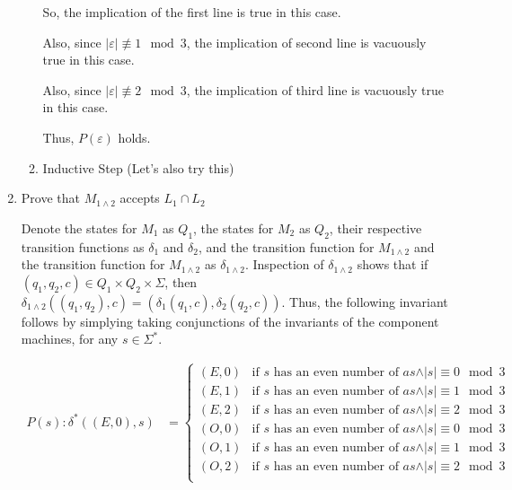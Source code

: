 \documentclass[12pt]{article}
\begin{document}
\begin{enumerate}[1.]
\begin{enumerate}[1.]
\begin{mdframed}
        \bigskip

        So, the implication of the first line is true in this case.

        \bigskip

        Also, since $\vert \varepsilon \vert \not\equiv 1 \mod 3$, the implication
        of second line is vacuously true in this case.

        \bigskip

        Also, since $\vert \varepsilon \vert \not\equiv 2 \mod 3$, the implication
        of third line is vacuously true in this case.

        \bigskip

        Thus, $P(\varepsilon)$ holds.

        \end{mdframed}

        \item Inductive Step (Let's also try this)

        \begin{mdframed}

        \end{mdframed}

    \end{enumerate}

    \item Prove that $M_{1\land2}$ accepts $L_1 \cap L_2$

    \bigskip

    Denote the states for $M_1$ as $Q_1$, the states for $M_2$ as $Q_2$, their
    respective transition functions as $\delta_1$ and $\delta_2$, and the transition
    function for $M_{1\land 2}$ and the transition function for $M_{1\land 2}$ as $\delta_{1 \land 2}$.
    Inspection of $\delta_{1 \land 2}$ shows that if $(q_1,q_2,c) \in Q_1 \times Q_2 \times \Sigma$,
    then $\delta_{1\land 2}((q_1,q_2),c) = (\delta_1(q_1,c),\delta_2(q_2,c))$. Thus,
    the following invariant follows by simplying taking conjunctions of the invariants
    of the component machines, for any $s \in \Sigma^*$.

    \begin{align}
        P(s):\delta^*((E,0),s) &= \begin{cases}
            (E,0) & \text{if $s$ has an even number of $as \land \vert s \vert \equiv 0 \mod 3$}\\
            (E,1) & \text{if $s$ has an even number of $as \land \vert s \vert \equiv 1 \mod 3$}\\
            (E,2) & \text{if $s$ has an even number of $as \land \vert s \vert \equiv 2 \mod 3$}\\
            (O,0) & \text{if $s$ has an even number of $as \land \vert s \vert \equiv 0 \mod 3$}\\
            (O,1) & \text{if $s$ has an even number of $as \land \vert s \vert \equiv 1 \mod 3$}\\
            (O,2) & \text{if $s$ has an even number of $as \land \vert s \vert \equiv 2 \mod 3$}\\
        \end{cases}
    \end{align}


\end{enumerate}
\end{document}

